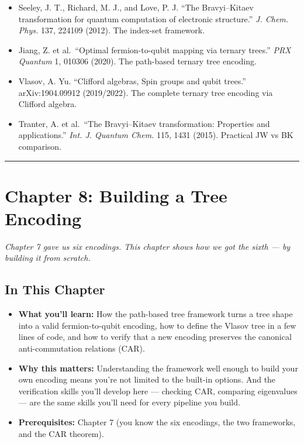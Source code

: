 \documentclass[
  11pt,
  oneside]{book}
\providecommand{\tightlist}{%
  \setlength{\itemsep}{0pt}\setlength{\parskip}{0pt}}
\begin{document}
\begin{itemize}
\tightlist
\item
  Seeley, J. T., Richard, M. J., and Love, P. J. ``The Bravyi--Kitaev
  transformation for quantum computation of electronic structure.''
  \emph{J. Chem. Phys.} 137, 224109 (2012). The index-set framework.
\item
  Jiang, Z. et al.~``Optimal fermion-to-qubit mapping via ternary
  trees.'' \emph{PRX Quantum} 1, 010306 (2020). The path-based ternary
  tree encoding.
\item
  Vlasov, A. Yu. ``Clifford algebras, Spin groups and qubit trees.''
  arXiv:1904.09912 (2019/2022). The complete ternary tree encoding via
  Clifford algebra.
\item
  Tranter, A. et al.~``The Bravyi--Kitaev transformation: Properties and
  applications.'' \emph{Int. J. Quantum Chem.} 115, 1431 (2015).
  Practical JW vs BK comparison.
\end{itemize}

\begin{center}\rule{0.5\linewidth}{0.5pt}\end{center}

\chapter{Chapter 8: Building a Tree
Encoding}\label{chapter-8-building-a-tree-encoding}

\emph{Chapter 7 gave us six encodings. This chapter shows how we got the
sixth --- by building it from scratch.}

\section{In This Chapter}\label{in-this-chapter-7}

\begin{itemize}
\tightlist
\item
  \textbf{What you'll learn:} How the path-based tree framework turns a
  tree shape into a valid fermion-to-qubit encoding, how to define the
  Vlasov tree in a few lines of code, and how to verify that a new
  encoding preserves the canonical anti-commutation relations (CAR).
\item
  \textbf{Why this matters:} Understanding the framework well enough to
  build your own encoding means you're not limited to the built-in
  options. And the verification skills you'll develop here --- checking
  CAR, comparing eigenvalues --- are the same skills you'll need for
  every pipeline you build.
\item
  \textbf{Prerequisites:} Chapter 7 (you know the six encodings, the two
  frameworks, and the CAR theorem).
\end{itemize}
\end{document}
